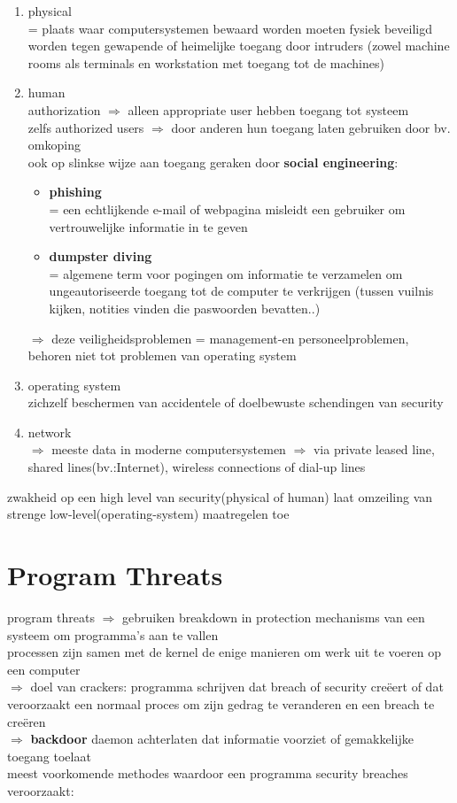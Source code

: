 \documentclass{report}
\begin{document}
\begin{enumerate}
\item physical
\\= plaats waar computersystemen bewaard worden moeten fysiek beveiligd worden tegen gewapende of heimelijke toegang door intruders (zowel machine rooms als terminals en workstation met toegang tot de machines)
\item{human}
\\authorization $\Rightarrow$ alleen appropriate user hebben toegang tot systeem
\\zelfs authorized users $\Rightarrow$ door anderen hun toegang laten gebruiken door bv. omkoping
\\ ook op slinkse wijze aan toegang geraken door \textbf{social engineering}:
\begin{itemize}
\item \textbf{phishing}
\\= een echtlijkende e-mail of webpagina misleidt een gebruiker om vertrouwelijke informatie in te geven
\item \textbf{dumpster diving}
\\= algemene term voor pogingen om informatie te verzamelen om ungeautoriseerde toegang tot de computer te verkrijgen (tussen vuilnis kijken, notities vinden die paswoorden bevatten..)
\end{itemize}
$\Rightarrow$ deze veiligheidsproblemen = management-en personeelproblemen, behoren niet tot problemen van operating system
\item operating system
\\zichzelf beschermen van accidentele of doelbewuste schendingen van security
\item network
\\$\Rightarrow$ meeste data in moderne computersystemen $\Rightarrow$ via private leased line, shared lines(bv.:Internet), wireless connections of dial-up lines
\end{enumerate}
zwakheid op een high level van security(physical of human) laat omzeiling van strenge low-level(operating-system) maatregelen toe

\section{Program Threats}
program threats $\Rightarrow$ gebruiken breakdown in protection mechanisms van een systeem om programma's aan te vallen
\\processen zijn samen met de kernel de enige manieren om werk uit te voeren op een computer
\\$\Rightarrow$ doel van crackers: programma schrijven dat breach of security cre\"eert of dat veroorzaakt een normaal proces om zijn gedrag te veranderen en een breach te cre\"eren
\\$\Rightarrow$ \textbf{backdoor} daemon achterlaten dat informatie voorziet of gemakkelijke toegang toelaat 
\\meest voorkomende methodes waardoor een programma security breaches veroorzaakt:
\end{document}
